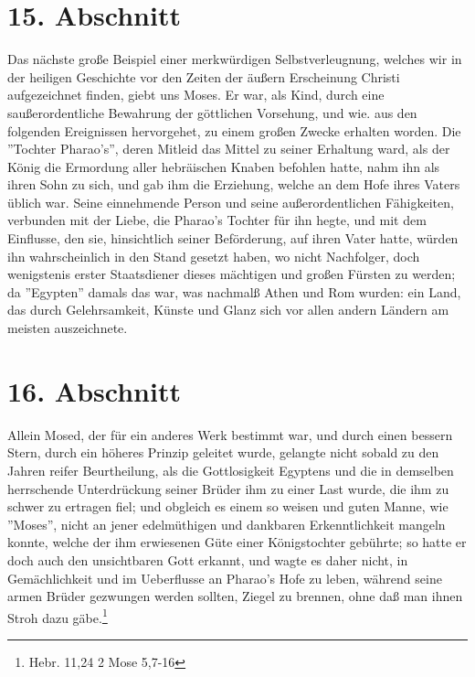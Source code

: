 \section{15. Abschnitt} \label{kap4_ab15}

Das nächste große Beispiel einer merkwürdigen Selbstverleugnung, welches wir in
der heiligen Geschichte vor den Zeiten der äußern Erscheinung Christi
aufgezeichnet finden, giebt uns Moses. Er war, als Kind, durch eine
saußerordentliche Bewahrung der göttlichen Vorsehung, und wie. aus den folgenden
Ereignissen hervorgehet, zu einem großen Zwecke erhalten worden. Die ''Tochter
Pharao’s'', deren Mitleid das Mittel zu seiner Erhaltung ward, als der König die
Ermordung aller hebräischen Knaben befohlen hatte, nahm ihn als ihren Sohn zu
sich, und gab ihm die Erziehung, welche an dem Hofe ihres Vaters üblich war.
Seine einnehmende Person und seine außerordentlichen Fähigkeiten, verbunden mit
der Liebe, die Pharao’s Tochter für ihn hegte, und mit dem Einflusse, den sie,
hinsichtlich seiner Beförderung, auf ihren Vater hatte, würden ihn
wahrscheinlich in den Stand gesetzt haben, wo nicht Nachfolger, doch wenigstenis
erster Staatsdiener dieses mächtigen und großen Fürsten zu werden; da
''Egypten'' damals das war, was nachmalß Athen und Rom wurden: ein Land, das
durch Gelehrsamkeit, Künste und Glanz sich vor allen andern Ländern am meisten
auszeichnete.

\section{16. Abschnitt} \label{kap4_ab16}

Allein Mosed, der für ein anderes Werk bestimmt war, und durch einen bessern
Stern, durch ein höheres Prinzip geleitet wurde, gelangte nicht sobald zu den
Jahren reifer Beurtheilung, als die Gottlosigkeit Egyptens und die in demselben
herrschende Unterdrückung seiner Brüder ihm zu einer Last wurde, die ihm zu
schwer zu ertragen fiel; und obgleich es einem so weisen und guten Manne, wie
''Moses'', nicht an jener edelmüthigen und dankbaren Erkenntlichkeit mangeln
konnte, welche der ihm erwiesenen Güte einer Königstochter gebührte; so hatte er
doch auch den unsichtbaren Gott erkannt, und wagte es daher nicht, in
Gemächlichkeit und im Ueberflusse an Pharao's Hofe zu leben, während seine armen
Brüder gezwungen werden sollten, Ziegel zu brennen, ohne daß man ihnen Stroh
dazu gäbe.\footnote{Hebr. 11,24 2 Mose 5,7-16}

\medskip

